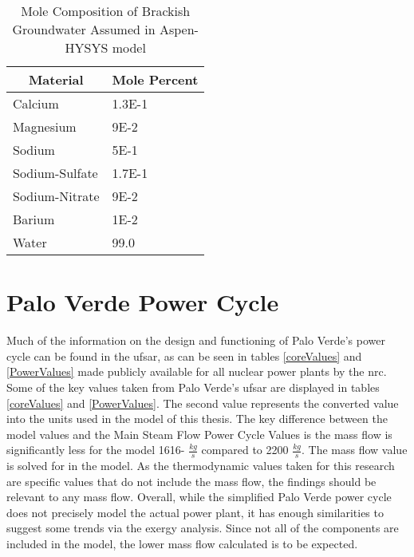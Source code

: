 \begin{table}[h!]
\centering
\caption{Mole Composition of Brackish Groundwater Assumed in Aspen-HYSYS model}
\begin{tabular}{|l|l|}
\hline
\multicolumn{1}{|c|}{\textbf{Material}}                   & \multicolumn{1}{c|}{\textbf{Mole Percent}} \\ \hline
Calcium & 1.3E-1 \\ \hline
Magnesium  & 9E-2\\ \hline
Sodium  & 5E-1 \\ \hline
Sodium-Sulfate & 1.7E-1 \\ \hline
Sodium-Nitrate & 9E-2 \\ \hline
Barium & 1E-2 \\ \hline
Water & 99.0  \\ \hline
\end{tabular}
\label{ModelComp}
\end{table}

\section{Palo Verde Power Cycle}

Much of the information on the design and functioning of Palo Verde's power cycle can be found in the \ac{ufsar}, as can be seen in tables \ref{coreValues} and \ref{PowerValues} made publicly available for all nuclear power plants by the \ac{nrc}. Some of the key values taken from Palo Verde's \ac{ufsar} are displayed in tables \ref{coreValues} and \ref{PowerValues}.  The second value represents the converted value into the units used in the model of this thesis.  The key difference between the model values and the Main Steam Flow Power Cycle Values is the mass flow is significantly less for the model 1616- $\frac{kg}{s}$ compared to 2200 $\frac{kg}{s}$. The mass flow value is solved for in the model. As the thermodynamic values taken for this research are specific values that do not include the mass flow, the findings should be relevant to any mass flow. Overall, while the simplified Palo Verde power cycle does not precisely model the actual power plant, it has enough similarities to suggest some trends via the exergy analysis. Since not all of the components are included in the model, the lower mass flow calculated is to be expected.

